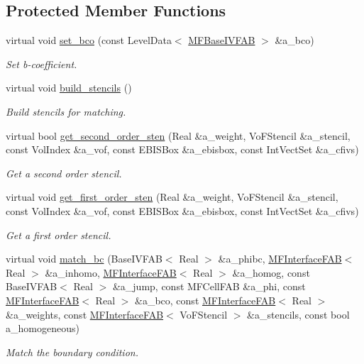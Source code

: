 \subsection*{Protected Member Functions}
\begin{DoxyCompactItemize}
\item 
virtual void \hyperlink{classjump__bc_ad7c78197adba46a24e980da1a6effb4a}{set\+\_\+bco} (const Level\+Data$<$ \hyperlink{classMFBaseIVFAB}{M\+F\+Base\+I\+V\+F\+AB} $>$ \&a\+\_\+bco)
\begin{DoxyCompactList}\small\item\em Set b-\/coefficient. \end{DoxyCompactList}\item 
virtual void \hyperlink{classjump__bc_a5b8edb9e2c2f8eebdd0aecd34a0cc33d}{build\+\_\+stencils} ()
\begin{DoxyCompactList}\small\item\em Build stencils for matching. \end{DoxyCompactList}\item 
virtual bool \hyperlink{classjump__bc_a2cc0f29756adeda3e3413edcbac09cd8}{get\+\_\+second\+\_\+order\+\_\+sten} (Real \&a\+\_\+weight, Vo\+F\+Stencil \&a\+\_\+stencil, const Vol\+Index \&a\+\_\+vof, const E\+B\+I\+S\+Box \&a\+\_\+ebisbox, const Int\+Vect\+Set \&a\+\_\+cfivs)
\begin{DoxyCompactList}\small\item\em Get a second order stencil. \end{DoxyCompactList}\item 
virtual void \hyperlink{classjump__bc_a8507ac98b8184c4d41d1473dafd3f3a5}{get\+\_\+first\+\_\+order\+\_\+sten} (Real \&a\+\_\+weight, Vo\+F\+Stencil \&a\+\_\+stencil, const Vol\+Index \&a\+\_\+vof, const E\+B\+I\+S\+Box \&a\+\_\+ebisbox, const Int\+Vect\+Set \&a\+\_\+cfivs)
\begin{DoxyCompactList}\small\item\em Get a first order stencil. \end{DoxyCompactList}\item 
virtual void \hyperlink{classjump__bc_a6b3b0e32cc55b93f97761eac200b7df9}{match\+\_\+bc} (Base\+I\+V\+F\+AB$<$ Real $>$ \&a\+\_\+phibc, \hyperlink{classMFInterfaceFAB}{M\+F\+Interface\+F\+AB}$<$ Real $>$ \&a\+\_\+inhomo, \hyperlink{classMFInterfaceFAB}{M\+F\+Interface\+F\+AB}$<$ Real $>$ \&a\+\_\+homog, const Base\+I\+V\+F\+AB$<$ Real $>$ \&a\+\_\+jump, const M\+F\+Cell\+F\+AB \&a\+\_\+phi, const \hyperlink{classMFInterfaceFAB}{M\+F\+Interface\+F\+AB}$<$ Real $>$ \&a\+\_\+bco, const \hyperlink{classMFInterfaceFAB}{M\+F\+Interface\+F\+AB}$<$ Real $>$ \&a\+\_\+weights, const \hyperlink{classMFInterfaceFAB}{M\+F\+Interface\+F\+AB}$<$ Vo\+F\+Stencil $>$ \&a\+\_\+stencils, const bool a\+\_\+homogeneous)
\begin{DoxyCompactList}\small\item\em Match the boundary condition. \end{DoxyCompactList}\end{DoxyCompactItemize}
